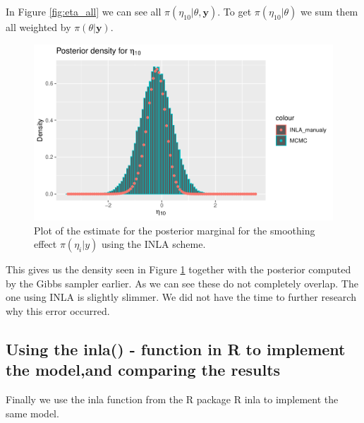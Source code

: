 In Figure \ref{fig:eta_all} we can see all $\pi(\eta_{10}|\theta, \boldsymbol{y})$. To get  $\pi(\eta_{10}|\theta)$ we sum them all weighted by $\pi(\theta|\boldsymbol{y})$. 

\begin{figure}[h!]
    \centering
    \includegraphics[width=\textwidth]{Images/post_eta_inla.pdf}
    \caption{Plot of the estimate for the posterior marginal for the smoothing effect $\pi(\eta_i|y)$ using the INLA scheme.}
    \label{fig:post_eta_inla}
\end{figure}

This gives us the density seen in Figure \ref{fig:post_eta_inla} together with the posterior computed by the Gibbs sampler earlier. As we can see these do not completely overlap. The one using INLA is slightly slimmer. We did not have the time to further research why this error occurred.

\subsection{Using the inla() - function in R to implement the model,and comparing the results}

Finally we use the inla function from the R package R inla to implement the same model. 



